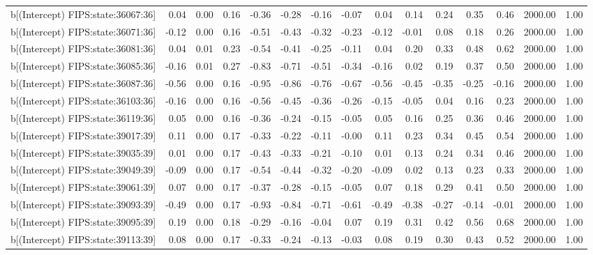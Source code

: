 \begin{table}[ht]
\begin{tabular}{rrrrrrrrrrrrrrr}
  b[(Intercept) FIPS:state:36067:36] & 0.04 & 0.00 & 0.16 & -0.36 & -0.28 & -0.16 & -0.07 & 0.04 & 0.14 & 0.24 & 0.35 & 0.46 & 2000.00 & 1.00 \\ 
  b[(Intercept) FIPS:state:36071:36] & -0.12 & 0.00 & 0.16 & -0.51 & -0.43 & -0.32 & -0.23 & -0.12 & -0.01 & 0.08 & 0.18 & 0.26 & 2000.00 & 1.00 \\ 
  b[(Intercept) FIPS:state:36081:36] & 0.04 & 0.01 & 0.23 & -0.54 & -0.41 & -0.25 & -0.11 & 0.04 & 0.20 & 0.33 & 0.48 & 0.62 & 2000.00 & 1.00 \\ 
  b[(Intercept) FIPS:state:36085:36] & -0.16 & 0.01 & 0.27 & -0.83 & -0.71 & -0.51 & -0.34 & -0.16 & 0.02 & 0.19 & 0.37 & 0.50 & 2000.00 & 1.00 \\ 
  b[(Intercept) FIPS:state:36087:36] & -0.56 & 0.00 & 0.16 & -0.95 & -0.86 & -0.76 & -0.67 & -0.56 & -0.45 & -0.35 & -0.25 & -0.16 & 2000.00 & 1.00 \\ 
  b[(Intercept) FIPS:state:36103:36] & -0.16 & 0.00 & 0.16 & -0.56 & -0.45 & -0.36 & -0.26 & -0.15 & -0.05 & 0.04 & 0.16 & 0.23 & 2000.00 & 1.00 \\ 
  b[(Intercept) FIPS:state:36119:36] & 0.05 & 0.00 & 0.16 & -0.36 & -0.24 & -0.15 & -0.05 & 0.05 & 0.16 & 0.25 & 0.36 & 0.46 & 2000.00 & 1.00 \\ 
  b[(Intercept) FIPS:state:39017:39] & 0.11 & 0.00 & 0.17 & -0.33 & -0.22 & -0.11 & -0.00 & 0.11 & 0.23 & 0.34 & 0.45 & 0.54 & 2000.00 & 1.00 \\ 
  b[(Intercept) FIPS:state:39035:39] & 0.01 & 0.00 & 0.17 & -0.43 & -0.33 & -0.21 & -0.10 & 0.01 & 0.13 & 0.24 & 0.34 & 0.46 & 2000.00 & 1.00 \\ 
  b[(Intercept) FIPS:state:39049:39] & -0.09 & 0.00 & 0.17 & -0.54 & -0.44 & -0.32 & -0.20 & -0.09 & 0.02 & 0.13 & 0.23 & 0.33 & 2000.00 & 1.00 \\ 
  b[(Intercept) FIPS:state:39061:39] & 0.07 & 0.00 & 0.17 & -0.37 & -0.28 & -0.15 & -0.05 & 0.07 & 0.18 & 0.29 & 0.41 & 0.50 & 2000.00 & 1.00 \\ 
  b[(Intercept) FIPS:state:39093:39] & -0.49 & 0.00 & 0.17 & -0.93 & -0.84 & -0.71 & -0.61 & -0.49 & -0.38 & -0.27 & -0.14 & -0.01 & 2000.00 & 1.00 \\ 
  b[(Intercept) FIPS:state:39095:39] & 0.19 & 0.00 & 0.18 & -0.29 & -0.16 & -0.04 & 0.07 & 0.19 & 0.31 & 0.42 & 0.56 & 0.68 & 2000.00 & 1.00 \\ 
  b[(Intercept) FIPS:state:39113:39] & 0.08 & 0.00 & 0.17 & -0.33 & -0.24 & -0.13 & -0.03 & 0.08 & 0.19 & 0.30 & 0.43 & 0.52 & 2000.00 & 1.00 \\ 

\end{tabular}
\end{table}

